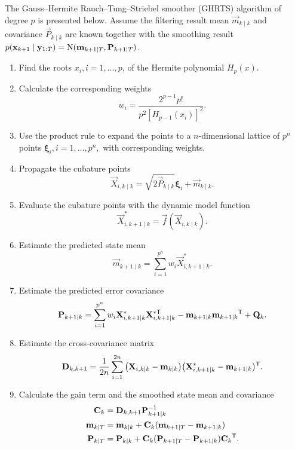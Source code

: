 The Gauss--Hermite Rauch--Tung--Striebel smoother (GHRTS) algorithm \citep{Sarkka+Hartikainen:2010} of degree $p$ is presented below. Assume the filtering result mean $\vec{m}_{k \mid k}$ and covariance $\vec{P}_{k \mid k}$ are known together with the smoothing result $ p(\mathbf{x}_{k+1} \mid \mathbf{y}_{1:T}) = \operatorname{N}(\mathbf{m}_{k+1 \mid T},\mathbf{P}_{k+1 \mid T})$.


\begin{enumerate}

  \item Find the roots $x_i, i=1,\ldots,p$, of the Hermite polynomial $H_p(x)$.%

  \item Calculate the corresponding weights%
%
   $$ w_i = \frac{2^{p-1}p!}{p^2[H_{p-1}(x_i)]^2}. $$

  \item Use the product rule to expand the points to a $n$-dimensional lattice of $p^n$ points $\boldsymbol{\xi}_i, i=1,\ldots,p^n,$ with corresponding weights.  

  \item Propagate the cubature points%
%
    $$ \vec{X}_{i,k \mid k} = \sqrt{2 \vec{P}_{k \mid k}} \boldsymbol{\xi}_i + \vec{m}_{k \mid k}. $$

  \item Evaluate the cubature points with the dynamic model function%
%
    $$ \vec{X}_{i,k+1 \mid k}^* = \vec{f}(\vec{X}_{i,k \mid k}). $$

  \item Estimate the predicted state mean%
%
    $$ \vec{m}_{k+1 \mid k}  = \sum_{i=1}^{p^n} w_i \vec{X}_{i,k+1 \mid k}^*. $$

  \item Estimate the predicted error covariance%
%
    $$ \mathbf{P}_{k+1 \mid k} = \sum_{i=1}^{p^n} w_i \mathbf{X}_{i,k+1 \mid k}^* \mathbf{X}_{i,k+1 \mid k}^{*\mathsf{T}} - \mathbf{m}_{k+1 \mid k} \mathbf{m}_{k+1 \mid k}\mathsf{^T} + \mathbf{Q}_{k}.$$

  \item Estimate the cross-covariance matrix%
%
    $$ \mathbf{D}_{k , k+1} = {1 \over 2 n} \sum_{i=1}^{2 n} \big(\mathbf{X}_{i,k \mid k} - \mathbf{m}_{k \mid k}\big) \\ \big(\mathbf{X}_{i,k+1 \mid k}^* - \mathbf{m}_{k+1 \mid k}\big)\mathsf{^T}. $$ 

  \item Calculate the gain term and the smoothed state mean and covariance%
%
  \begin{align*}
     \mathbf{C}_k &= \mathbf{D}_{k , k+1} \mathbf{P}_{k+1 \mid k}^{-1} \\
     \mathbf{m}_{k \mid T} &= \mathbf{m}_{k \mid k} + \mathbf{C}_k(\mathbf{m}_{k+1 \mid T} - \mathbf{m}_{k+1 \mid k}) \\
     \mathbf{P}_{k \mid T} &= \mathbf{P}_{k \mid k} + \mathbf{C}_k (\mathbf{P}_{k+1 \mid T} - \mathbf{P}_{k+1 \mid k}) \mathbf{C}_k\mathsf{^T}.
  \end{align*}

\end{enumerate}














